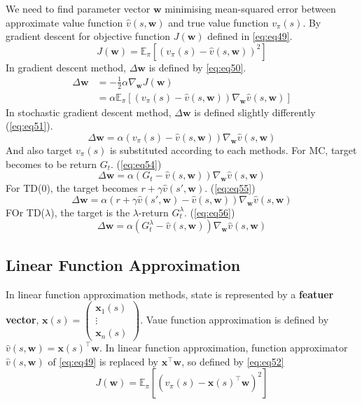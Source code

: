 \documentclass[
	10pt, %
]{article}
\theoremstyle{plain}
\newcommand{\mbb}[1]{\mathbb{#1}}
\newcommand{\mb}[1]{\mathbf{#1}}
\newcommand{\tb}[1]{\textbf{#1}}
\numberwithin{equation}{subsection} %
\begin{document}
We need to find parameter vector $\mb{w}$ minimising mean-squared error between approximate value function $\hat{v}(s, \mb{w})$ and true value function $v_\pi(s)$.
By gradient descent for objective function $J(\mb{w})$ defined in \cref{eq:eq49}.
\begin{equation} \label{eq:eq49}
    J(\mb{w}) = \mbb{E}_\pi[(v_\pi(s) - \hat{v}(s, \mb{w}))^2]
\end{equation}
In gradient descent method, $\Delta \mb{w}$ is defined by \cref{eq:eq50}.
\begin{equation} \label{eq:eq50}
\begin{aligned}
    \Delta \mb{w} &= -\frac{1}{2} \alpha \nabla_\mb{w} J(\mb{w})\\
    &= \alpha \mbb{E}_\pi [(v_\pi(s) - \hat{v}(s, \mb{w}))\nabla_\mb{w} \hat{v}(s,\mb{w})]
\end{aligned}
\end{equation}
In stochastic gradient descent method, $\Delta \mb{w}$ is defined slightly differently (\cref{eq:eq51}).
\begin{equation} \label{eq:eq51}
    \Delta \mb{w} = \alpha (v_\pi(s) - \hat{v}(s, \mb{w})) \nabla_\mb{w} \hat{v}(s, \mb{w})
\end{equation}
And also target $v_\pi(s)$ is substituted according to each methods. For MC, target becomes to be return $G_t$. (\cref{eq:eq54})
\begin{equation} \label{eq:eq54}
    \Delta \mb{w} = \alpha (G_t - \hat{v}(s, \mb{w})) \nabla_\mb{w} \hat{v}(s, \mb{w})
\end{equation}
For TD(0), the target becomes $r + \gamma \hat{v}(s', \mb{w})$. (\cref{eq:eq55})
\begin{equation} \label{eq:eq55}
    \Delta \mb{w} = \alpha (r + \gamma \hat{v}(s', \mb{w}) - \hat{v}(s, \mb{w})) \nabla_\mb{w} \hat{v}(s, \mb{w})
\end{equation}
FOr TD($\lambda$), the target is the $\lambda$-return $G^\lambda_t$. (\cref{eq:eq56})
\begin{equation} \label{eq:eq56}
    \Delta \mb{w} = \alpha (G^\lambda_t - \hat{v}(s, \mb{w})) \nabla_\mb{w} \hat{v}(s, \mb{w})
\end{equation}


\subsection{Linear Function Approximation}
In linear function approximation methods, state is represented by a \tb{featuer vector}, $\mb{x}(s) = \begin{pmatrix}
\mb{x}_1(s) \\ \vdots \\ \mb{x}_n(s)
\end{pmatrix}$. Vaue function approximation is defined by $\hat{v}(s,\mb{w}) = \mb{x}(s)^\top \mb{w}$.
In linear function approximation, function approximator $\hat{v}(s,\mb{w})$ of \cref{eq:eq49} is replaced by $\mb{x}^\top\mb{w}$, so defined by \cref{eq:eq52}
\begin{equation} \label{eq:eq52}
    J(\mb{w}) = \mbb{E}_\pi[(v_\pi(s) - \mb{x}(s)^\top \mb{w})^2]
\end{equation}
\end{document}
